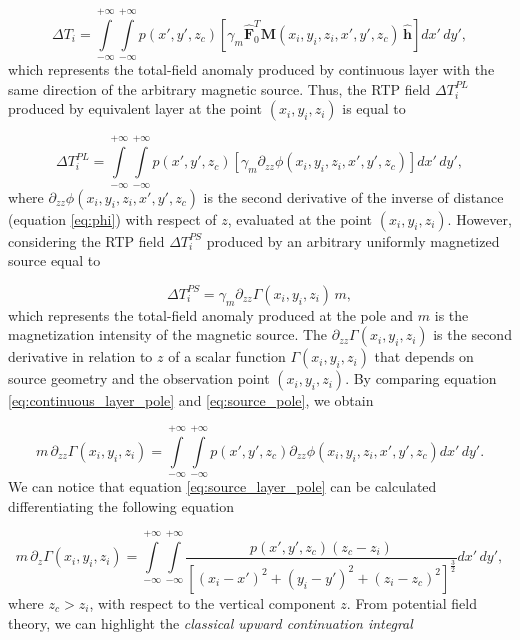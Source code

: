 \begin{equation}
\Delta T_i = \int \limits_{-\infty}^{+\infty } \int \limits_{-\infty}^{+\infty }  p(x',y',z_c)  [\gamma_m \hat{\mathbf{F}}_0^T \mathbf{M}(x_i,y_i,z_i,x',y',z_c) \,\hat{\mathbf{h}}] dx' \,dy',
\label{eq:continuous_layer_source}
\end{equation} 
which represents the total-field anomaly produced by continuous layer with the same direction of the arbitrary magnetic source. Thus, the RTP field $\Delta T_{i}^{PL}$ produced by equivalent layer at the point $(x_i,y_i,z_i)$ is equal to 

\begin{equation}
\Delta T_{i}^{PL} = \int \limits_{-\infty}^{+\infty } \int \limits_{-\infty}^{+\infty }  p(x',y',z_c)  [\gamma_m \partial_{zz} \phi(x_i,y_i,z_i,x',y',z_c) ] dx' \,dy',
\label{eq:continuous_layer_pole}
\end{equation}
where $\partial_{zz} \phi(x_i,y_i,z_i,x',y',z_c)$ is the second derivative of the inverse of distance (equation \ref{eq:phi}) with respect of $z$, evaluated at the point $(x_i,y_i,z_i)$. However, considering the RTP field $\Delta T_{i}^{PS}$ produced by an arbitrary uniformly magnetized source equal to

\begin{equation}
\Delta T_{i}^{PS} = \gamma_m \partial_{zz} \Gamma(x_i,y_i,z_i) \, m,
\label{eq:source_pole}
\end{equation}
which represents the total-field anomaly produced at the pole and $m$ is the magnetization intensity of the magnetic source. The $\partial_{zz} \Gamma(x_i,y_i,z_i)$ is the second derivative in relation to $z$ of a scalar function $\Gamma(x_i,y_i,z_i)$ that depends on source geometry and the observation point $(x_i,y_i,z_i)$. By comparing equation \ref{eq:continuous_layer_pole} and \ref{eq:source_pole}, we obtain 
 
\begin{equation}
m \, \partial_{zz} \Gamma(x_i,y_i,z_i) = \int \limits_{-\infty}^{+\infty } \int \limits_{-\infty}^{+\infty }  p(x',y',z_c)  \partial_{zz} \phi(x_i,y_i,z_i,x',y',z_c)  dx' \,dy'.
\label{eq:source_layer_pole}
\end{equation}
We can notice that equation \ref{eq:source_layer_pole} can be calculated differentiating the following equation

\begin{equation}
m \, \partial_{z} \Gamma(x_i,y_i,z_i) = \int \limits_{-\infty}^{+\infty } \int \limits_{-\infty}^{+\infty }  \dfrac{p(x',y',z_c) (z_c - z_i)}{[(x_i-x')^2 + (y_i-y')^2 + (z_i-z_c)^2]^{\frac{3}{2}}}    dx' \,dy',
\label{eq:mag_upward}
\end{equation}
where $z_c > z_i$, with respect to the vertical component $z$. From potential field theory, we can highlight the \textit{classical upward continuation integral} 

